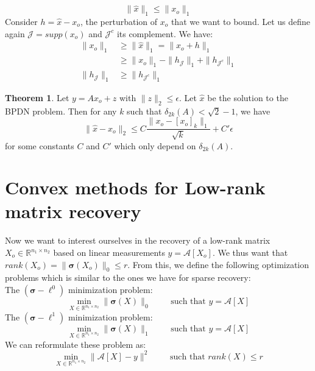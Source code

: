 \documentclass[12pt, openany]{report}
\newcommand{\R}{\mathbb{R}}
\theoremstyle{definition}
\newtheorem{thm}{Theorem}[chapter]
\begin{document}
\begin{equation}
	\|\hat{x}\|_1 \leq \|x_o\|_1
\end{equation}
Consider $h = \hat{x} - x_o$, the perturbation of $x_o$ that we want to bound. Let us define again $\mathcal{J} = supp(x_o)$ and $\mathcal{J}^c$ its complement. We have:
\begin{equation}
	\begin{aligned}
		\|x_o\|_1 &\geq \|\hat{x}\|_1 = \|x_o + h\|_1\\
		&\geq \|x_o\|_1 - \|h_\mathcal{J}\|_1 + \|h_{\mathcal{J}^c}\|_1 \\
		\|h_\mathcal{J}\|_1 &\geq \|h_{\mathcal{J}^c}\|_1
	\end{aligned}
\end{equation}
\begin{thm}
	Let $y = Ax_o + z$ with $\|z\|_2 \leq \epsilon$. Let $\hat{x}$ be the solution to the BPDN problem. Then for any $k$ such that $\delta_{2k}(A) < \sqrt{2}-1$, we have
	\begin{equation}
		\|\hat{x} - x_o\|_2 \leq C \frac{\|x_o - [x_o]_k\|_1}{\sqrt{k}} + C' \epsilon
	\end{equation}
	for some constants $C$ and $C'$ which only depend on $\delta_{2k}(A)$.
\end{thm}
\section{Convex methods for Low-rank matrix recovery}
Now we want to interest ourselves in the recovery of a low-rank matrix $X_o\in \R^{n_1\times n_2}$ based on linear measurements $y = \mathcal{A}[X_o]$. We thus want that $rank(X_o) = \|\boldsymbol{\sigma}(X_o)\|_0 \leq r$. From this, we define the following optimization problems which is similar to the ones we have for sparse recovery:\\
The $(\boldsymbol{\sigma}-\ell^0)$ minimization problem:
\begin{equation}
	\min_{X\in \R^{n_1\times n_2}} \|\boldsymbol{\sigma}(X)\|_0 \qquad \text{ such that } y = \mathcal{A}[X]
\end{equation}
The $(\boldsymbol{\sigma}-\ell^1)$ minimization problem:
\begin{equation}
	\min_{X\in \R^{n_1\times n_2}} \|\boldsymbol{\sigma}(X)\|_1 \qquad \text{ such that } y = \mathcal{A}[X]
\end{equation}
We can reformulate these problem as:
\begin{equation}
	\min_{X\in \R^{n_1\times n_2}} \|\mathcal{A}[X]-y\|^2 \qquad \text{ such that } rank(X) \leq r
\end{equation}
\end{document}

